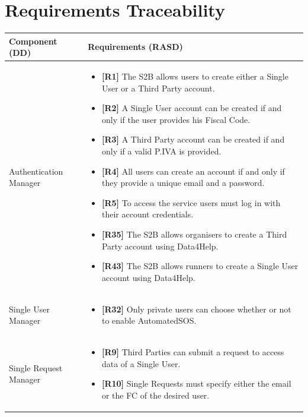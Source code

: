 \documentclass[titlepage]{article}
\begin{document}

\section{Requirements Traceability}

\begin{longtable}{| p{5 cm} | p{8 cm} |} \hline
		Component (DD) & Requirements (RASD)  \\ \hline
		\newline Authentication Manager & 
		\begin{itemize}
			\item {\bf [R1]} The S2B allows users to create either a Single User or a Third Party account. 
			\item {\bf [R2]} A Single User account can be created if and only if the user provides his Fiscal Code. 
			\item {\bf [R3]} A Third Party account can be created if and only if a valid P.IVA is provided. 
			\item {\bf [R4]} All users can create an account if and only if they provide a unique email and a password. 
			\item {\bf [R5]} To access the service users must log in with their account credentials.
			\item {\bf [R35]} The S2B allows organisers to create a Third Party account using Data4Help.
			\item {\bf [R43]} The S2B allows runners to create a Single User account using Data4Help.
		\end{itemize}	\\ \hline
		\newline Single User Manager & 
		\begin{itemize}
			\item {\bf [R32]} Only private users can choose whether or not to enable AutomatedSOS. 
		\end{itemize}		
		\\	 \hline	
		\newline Single Request Manager & 
		\begin{itemize}
			\item {\bf [R9]} Third Parties can submit a request to access data of a Single User. 
			\item {\bf [R10]} Single Requests must specify either the email or the FC of the desired user.

\end{itemize}
\end{longtable}
\end{document}
